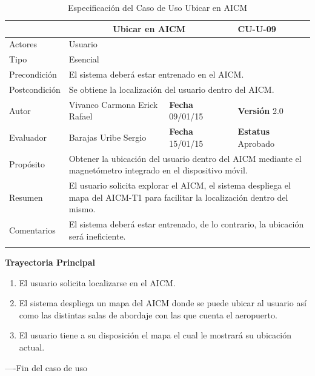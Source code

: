 \begin{longtable}{|p{2.5cm}|p{6.4cm}|p{2cm}|p{2cm}|}
	\hline
		\rowcolor[RGB]{51,153,255}{Caso de Uso}&\multicolumn{2}{c}{Ubicar en AICM}&{\textbf{CU-U-09}}\\
	\hline
		{Actores}&\multicolumn{3}{p{11.2cm}|}{Usuario}\\
	\hline
		{Tipo}&\multicolumn{3}{p{11.2cm}|}{Esencial}\\
	\hline
		{Precondición}&\multicolumn{3}{p{11.2cm}|}{El sistema deberá estar entrenado en el AICM.}\\
	\hline
		{Postcondición}&\multicolumn{3}{p{11.2cm}|}{Se obtiene la localización del usuario dentro del AICM.}\\
	\hline
		{Autor}&{Vivanco Carmona Erick Rafael}&{\textbf{Fecha} 09/01/15}&{\textbf{Versión} 2.0}\\
			\hline
		{Evaluador}&{Barajas Uribe Sergio}&{\textbf{Fecha} 15/01/15}&{\textbf{Estatus} Aprobado}\\
	\hline
		{Propósito}&\multicolumn{3}{p{11.2cm}|}{Obtener la ubicación del usuario dentro del AICM mediante el magnetómetro integrado en el dispositivo móvil. }\\
	\hline
		{Resumen}&\multicolumn{3}{p{11.2cm}|}{El usuario solicita explorar el AICM, el sistema despliega el mapa del AICM-T1 para facilitar la localización dentro del mismo.}\\	
	\hline
		{Comentarios}&\multicolumn{3}{p{11.2cm}|}{El sistema deberá estar entrenado, de lo contrario, la ubicación será ineficiente.}\\
	\hline
	\caption[Especificación del Caso de Uso Ubicar en AICM]{Especificación del Caso de Uso Ubicar en AICM}
    	\label{tab:cuUbicarAICM}
\end{longtable}
\clearpage

\begin{flushleft}
	\textbf{Trayectoria Principal}\\
	\begin{enumerate}
		\item El usuario solicita localizarse en el AICM.
		\item El sistema despliega un mapa del AICM donde se puede ubicar al usuario así como las distintas salas de abordaje con las que cuenta el 
		aeropuerto.
		\item El usuario tiene a su disposición el mapa el cual le mostrará su ubicación actual.
	\end{enumerate}
\end{flushleft}
----Fin del caso de uso
\clearpage

